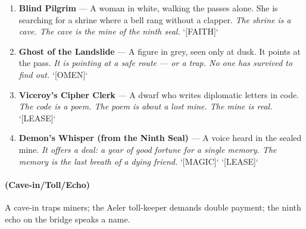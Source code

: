 \begin{enumerate}
\item[J] \textbf{Blind Pilgrim} --- A woman in white, walking the passes alone. She is searching for a shrine where a bell rang without a clapper.
  \hfill \textit{The shrine is a cave. The cave is the mine of the ninth seal.} `[FAITH]`
\item[Q] \textbf{Ghost of the Landslide} --- A figure in grey, seen only at dusk. It points at the pass.
  \hfill \textit{It is pointing at a safe route — or a trap. No one has survived to find out.} `[OMEN]`
\item[K] \textbf{Viceroy's Cipher Clerk} --- A dwarf who writes diplomatic letters in code.
  \hfill \textit{The code is a poem. The poem is about a lost mine. The mine is real.} `[LEASE]`
\item[A] \textbf{Demon's Whisper (from the Ninth Seal)} --- A voice heard in the sealed mine.
  \hfill \textit{It offers a deal: a year of good fortune for a single memory. The memory is the last breath of a dying friend.} `[MAGIC]` `[LEASE]`
\end{enumerate}

\paragraph*{(Cave-in/Toll/Echo)} A cave-in traps miners; the Aeler toll-keeper demands double payment; the ninth echo on the bridge speaks a name.

